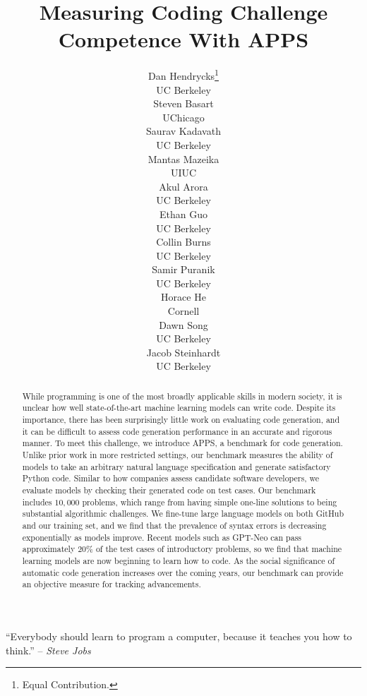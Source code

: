 \documentclass{article}
\title{Measuring Coding Challenge Competence With APPS}
\date{}
\author{Dan Hendrycks\thanks{Equal Contribution.}\\
UC Berkeley\\
\And
Steven Basart\printfnsymbol{1}\\
UChicago\\
\And
Saurav Kadavath\\
UC Berkeley\\
\And
Mantas Mazeika\\
UIUC\\
\And
Akul Arora\\
UC Berkeley\\
\And
Ethan Guo\\
UC Berkeley\\
\And
Collin Burns\\
UC Berkeley\\
\And
Samir Puranik\\
UC Berkeley\\
\And
Horace He\\
Cornell\\
\AND
Dawn Song\\
UC Berkeley\\
\And
Jacob Steinhardt\\
UC Berkeley\\
}
\begin{document}
\maketitle



\begin{abstract}
While programming is one of the most broadly applicable skills in modern society, it is unclear how well state-of-the-art machine learning models can write code. Despite its importance, there has been surprisingly little work on evaluating code generation, and it can be difficult to assess code generation performance in an accurate and rigorous manner. To meet this challenge, we introduce APPS, a benchmark for code generation. Unlike prior work in more restricted settings, our benchmark measures the ability of models to take an arbitrary natural language specification and generate satisfactory Python code. Similar to how companies assess candidate software developers, we evaluate models by checking their generated code on test cases. Our benchmark includes $10,\!000$ problems, which range from having simple one-line solutions to being substantial algorithmic challenges. We fine-tune large language models on both GitHub and our training set, and we find that the prevalence of syntax errors is decreasing exponentially as models improve. Recent models such as GPT-Neo can pass approximately $20\%$ of the test cases of introductory problems, so we find that machine learning models are now beginning to learn how to code. As the social significance of automatic code generation increases over the coming years, our benchmark can provide an objective measure for tracking advancements.
\end{abstract}


``Everybody should learn to program a computer, because it teaches you how to think.'' -- \emph{Steve Jobs}













\newpage

\appendix

\end{document}
